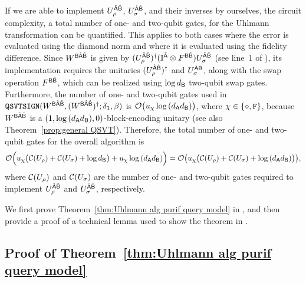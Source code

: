 If we are able to implement $U_\rho^{\hat{{\mathsf{A}}}\hat{{\mathsf{B}}}}$, $U_\sigma^{\hat{{\mathsf{A}}}\hat{{\mathsf{B}}}}$, and their inverses by ourselves, the circuit complexity, a total number of one- and two-qubit gates, for the Uhlmann transformation can be quantified. 
This applies to both cases where the error is evaluated using the diamond norm and where it is evaluated using the fidelity difference.
Since $W^{{\mathsf{B}}\hat{{\mathsf{A}}}\hat{{\mathsf{B}}}}$ is given by $(U_\rho^{\hat{{\mathsf{A}}}\hat{{\mathsf{B}}}})^\dag(\mathbb{I}^{\hat{{\mathsf{A}}}} \otimes F^{{\mathsf{B}}\hat{{\mathsf{B}}}})U_\sigma^{\hat{{\mathsf{A}}}\hat{{\mathsf{B}}}}$ (see line~1 of ), its implementation requires the unitaries $(U_\rho^{\hat{{\mathsf{A}}}\hat{{\mathsf{B}}}})^\dag$ and $U_\sigma^{\hat{{\mathsf{A}}}\hat{{\mathsf{B}}}}$, along with the swap operation $F^{{\mathsf{B}}\hat{{\mathsf{B}}}}$, which can be realized using $\log d_{\mathsf{B}}$ two-qubit swap gates.
Furthermore, the number of one- and two-qubit gates used in $\mathtt{QSVTSIGN}(W^{{\mathsf{B}}\hat{{\mathsf{A}}}\hat{{\mathsf{B}}}}, (W^{{\mathsf{B}}\hat{{\mathsf{A}}}\hat{{\mathsf{B}}}})^\dag; \delta_1, \beta)$ is ${\mathcal{O}}\big(u_\chi\log{(d_{\mathsf{A}}d_{\mathsf{B}})}\big)$, where $\chi \in \{\diamond, \mathtt{F}\}$, because $W^{{\mathsf{B}}\hat{{\mathsf{A}}}\hat{{\mathsf{B}}}}$ is a $(1, \log{(d_{\mathsf{A}}d_{\mathsf{B}})}, 0)$-block-encoding unitary (see also Theorem~\ref{prop:general QSVT}). 
Therefore, the total number of one- and two-qubit gates for the overall algorithm is 
\begin{align}
    {\mathcal{O}}\Big(u_\chi \big({\mathcal{C}}(U_\rho) + {\mathcal{C}}(U_\sigma) + \log{d_{\mathsf{B}}}\big) + u_\chi\log{(d_{\mathsf{A}}d_{\mathsf{B}})} \Big) 
    ={\mathcal{O}}\big(u_\chi\big({\mathcal{C}}(U_\rho) + {\mathcal{C}}(U_\sigma) + \log{(d_{\mathsf{A}}d_{\mathsf{B}})}\big)\big),
\end{align}
where ${\mathcal{C}}(U_\rho)$ and ${\mathcal{C}}(U_\sigma)$ are the number of one- and two-qubit gates required to implement $U_\rho^{\hat{{\mathsf{A}}}\hat{{\mathsf{B}}}}$ and $U_\sigma^{\hat{{\mathsf{A}}}\hat{{\mathsf{B}}}}$, respectively.





We first prove Theorem~\ref{thm:Uhlmann alg purif query model} in , and then provide a proof of a technical lemma used to show the theorem in .







\subsection{Proof of Theorem~\ref{thm:Uhlmann alg purif query model}}
\label{sec:proof purif query Uhl}



